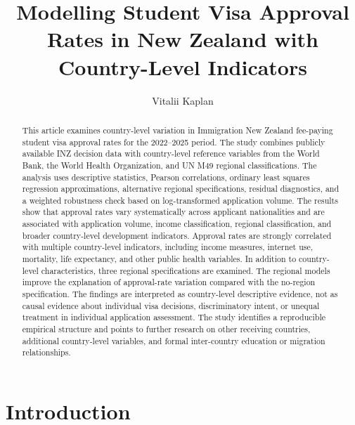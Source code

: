 \documentclass[runningheads]{llncs}
\begin{document}
\title{Modelling Student Visa Approval Rates in New Zealand with Country-Level Indicators}

\author{Vitalii Kaplan}

\maketitle

\begin{abstract}
This article examines country-level variation in Immigration New Zealand fee-paying student visa approval rates for the 2022--2025 period. The study combines publicly available INZ decision data with country-level reference variables from the World Bank, the World Health Organization, and UN M49 regional classifications. 
The analysis uses descriptive statistics, Pearson correlations, ordinary least squares regression approximations, alternative regional specifications, residual diagnostics, and a weighted robustness check based on log-transformed application volume.
The results show that approval rates vary systematically across applicant nationalities and are associated with application volume, income classification, regional classification, and broader country-level development indicators. 
Approval rates are strongly correlated with multiple country-level indicators, including income measures, internet use, mortality, life expectancy, and other public health variables. In addition to country-level characteristics, three regional specifications are examined. The regional models improve the explanation of approval-rate variation compared with the no-region specification.
The findings are interpreted as country-level descriptive evidence, not as causal evidence about individual visa decisions, discriminatory intent, or unequal treatment in individual application assessment.
The study identifies a reproducible empirical structure and points to further research on other receiving countries, additional country-level variables, and formal inter-country education or migration relationships.

\end{abstract}

\section{Introduction}
\end{document}

